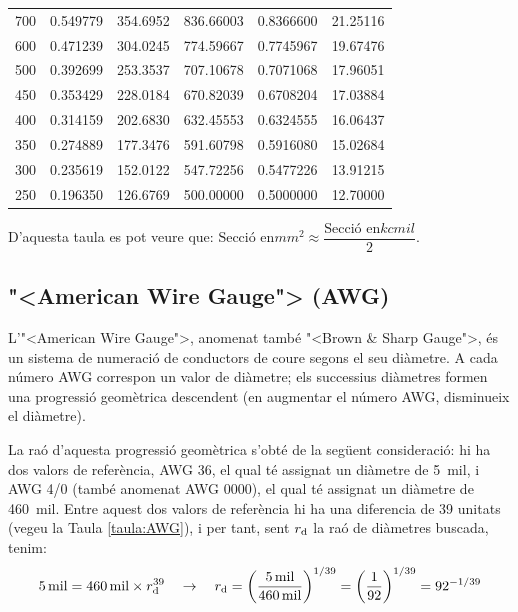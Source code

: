 \begin{longtable}{r<{\hspace{0.6em}}rrrrr}
 700 &   \num{0,549779} &   \num{354,6952}  & \num{ 836,66003} &  \num{0,8366600} &   \num{21,25116} \\
 600 &   \num{0,471239} &   \num{304,0245}  & \num{ 774,59667} &  \num{0,7745967} &   \num{19,67476} \\
 500 &   \num{0,392699} &   \num{253,3537}  & \num{ 707,10678} &  \num{0,7071068} &   \num{17,96051} \\
 450 &   \num{0,353429} &   \num{228,0184}  & \num{ 670,82039} &  \num{0,6708204} &   \num{17,03884} \\
 400 &   \num{0,314159} &   \num{202,6830}  & \num{ 632,45553} &  \num{0,6324555} &   \num{16,06437} \\
 350 &   \num{0,274889} &   \num{177,3476}  & \num{ 591,60798} &  \num{0,5916080} &   \num{15,02684} \\
 300 &   \num{0,235619} &   \num{152,0122}  & \num{ 547,72256} &  \num{0,5477226} &   \num{13,91215} \\
 250 &   \num{0,196350} &   \num{126,6769}  & \num{ 500,00000} &  \num{0,5000000} &   \num{12,70000} \\
\bottomrule[1pt]
\end{longtable}

D'aquesta taula es pot veure que: $\text{Secci\'{o} en}\unit{mm^2} \approx \dfrac{\text{Secci\'{o} en}\unit{kcmil}}{2}$.

\break
\subsection{{"<}American Wire Gauge{">} (AWG)}

L'{"<}American Wire Gauge{">}, anomenat tamb\'{e} {"<}Brown \& Sharp Gauge{">}, \'{e}s un sistema de numeraci\'{o} de conductors de coure segons el seu di\`{a}metre. A cada n\'{u}mero AWG correspon un valor de di\`{a}metre; els successius di\`{a}metres formen una progressi\'{o} geom\`{e}trica descendent (en augmentar el n\'{u}mero AWG, disminueix el di\`{a}metre).

La ra\'{o} d'aquesta progressi\'{o} geom\`{e}trica s'obt\'{e} de la seg\"{u}ent consideraci\'{o}: hi ha dos valors de refer\`{e}ncia, AWG 36, el qual t\'{e} assignat un di\`{a}metre de \SI{5}{mil}, i AWG 4/0 (tamb\'{e} anomenat AWG 0000), el qual t\'{e} assignat un di\`{a}metre de \SI{460}{mil}. Entre aquest dos valors de refer\`{e}ncia hi ha una diferencia de 39 unitats (vegeu la Taula \vref{taula:AWG}), i per tant, sent $r_\mathrm{d}$ la ra\'{o} de di\`{a}metres buscada, tenim:
\begin{equation}
   \SI{5}{mil} = \SI{460}{mil} \times r_\mathrm{d}^{39} \quad \rightarrow \quad r_\mathrm{d} = \left( \frac{\SI{5}{mil}}{\SI{460}{mil}} \right)^{1/39} = \left( \frac{1}{92} \right)^{1/39} = 92^{-1/39}
\end{equation}

